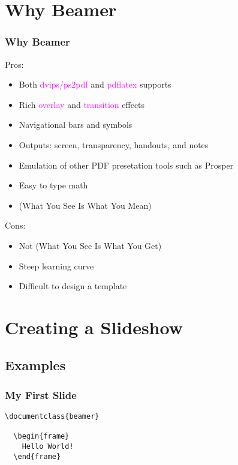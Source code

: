 \section{Why Beamer}
\begin{frame}[fragile]
\frametitle{Why Beamer}

  Pros:

  \begin{itemize}
    \item Both \textcolor{magenta}{dvips/ps2pdf} and \textcolor{magenta}{pdflatex} supports
    \item Rich \textcolor{magenta}{overlay} and \textcolor{magenta}{transition} effects
    \item Navigational bars and symbols
    \item Outputs: screen, transparency, handouts, and notes
    \item Emulation of other PDF presetation tools such as Prosper
    \item Easy to type math
    \item {} (What You See Is What You Mean)
  \end{itemize}

  Cons:

  \begin{itemize}
    \item Not  (What You See Is What You Get)
    \item Steep learning curve
    \item Difficult to design a template
  \end{itemize}

\end{frame}
\section{Creating a Slideshow}
\subsection{Examples}
\begin{frame}[fragile]
\frametitle{My First Slide}
  \begin{footnotesize}
    \begin{verbatim}
\documentclass{beamer}

  \begin{frame}
    Hello World!
  \end{frame}

    \end{verbatim}
  \end{footnotesize}
\end{frame}
